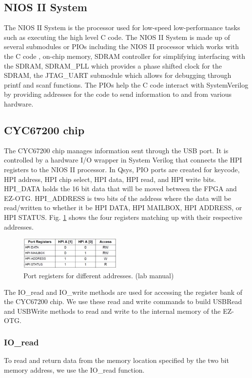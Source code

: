\documentclass[journal, twocolumn, final,11pt,letterpaper]{IEEEtran}
\begin{document}
\subsection{NIOS II System}
The NIOS II System is the processor used for low-speed low-performance tasks such as executing the high level C code.  The NIOS II System is made up of several submodules or PIOs including the NIOS II processor which works with the C code , on-chip memory, SDRAM controller for simplifying interfacing with the SDRAM, SDRAM\_PLL  which provides a phase shifted clock for the SDRAM, the JTAG\_UART submodule which allows for debugging through printf and scanf functions. The PIOs help the C code interact with SystemVerilog by providing addresses for the code to send information to and from various hardware. 



\subsection{CYC67200 chip}
The CYC67200 chip manages information sent through the USB port.  It is controlled by a hardware I/O wrapper in System Verilog that connects the HPI registers to the NIOS II processor.  In Qsys, PIO ports are created for keycode, HPI address, HPI chip select, HPI data, HPI read, and HPI write bits.  HPI\_DATA holds the 16 bit data that will be moved between the FPGA and EZ-OTG.  HPI\_ADDRESS is two bits of the address where the data will be read/written to whether it be HPI DATA, HPI MAILBOX, HPI ADDRESS, or HPI STATUS. Fig. \ref{fig:ports} shows the four registers matching up with their respective addresses.   \\

\begin{figure}[h]
	\centering
	\includegraphics[width=0.45\textwidth]{ports.jpg}
	\caption{Port registers for different addresses. (lab manual)}
	\label{fig:ports}
\end{figure}

The IO\_read and IO\_write methods are used for accessing the register bank of the CYC67200 chip.  We use these read and write commands to build USBRead and USBWrite methods to read and write to the internal memory of the EZ-OTG.

\subsubsection{IO\_read}
To read and return data from the memory location specified by the two bit memory address, we use the IO\_read function. \\
\end{document}
